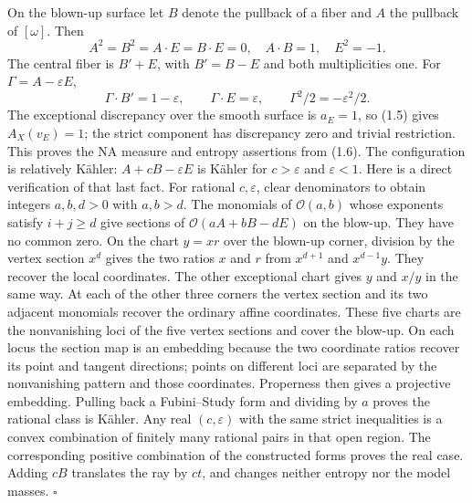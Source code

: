 \documentclass[
  11pt,
]{article}
\begin{document}
On the blown-up surface let \(B\) denote the pullback of a fiber and
\(A\) the pullback of \([\omega]\). Then \[
 A^2=B^2=A\cdot E=B\cdot E=0,\quad A\cdot B=1,\quad E^2=-1.
\] The central fiber is \(B'+E\), with \(B'=B-E\) and both
multiplicities one. For \(\Gamma=A-\varepsilon E\), \[
 \Gamma\cdot B'=1-\varepsilon,\qquad\Gamma\cdot E=\varepsilon,
 \qquad\Gamma^2/2=-\varepsilon^2/2.                                 \tag{3.5}
\] The exceptional discrepancy over the smooth surface is \(a_E=1\), so
(1.5) gives \(A_X(v_E)=1\); the strict component has discrepancy zero
and trivial restriction. This proves the NA measure and entropy
assertions from (1.6). The configuration is relatively Kähler:
\(A+cB-\varepsilon E\) is Kähler for \(c>\varepsilon\) and
\(\varepsilon<1\). Here is a direct verification of that last fact. For
rational \(c,\varepsilon\), clear denominators to obtain integers
\(a,b,d>0\) with \(a,b>d\). The monomials of \(\mathcal O(a,b)\) whose
exponents satisfy \(i+j\geq d\) give sections of
\(\mathcal O(aA+bB-dE)\) on the blow-up. They have no common zero. On
the chart \(y=xr\) over the blown-up corner, division by the vertex
section \(x^d\) gives the two ratios \(x\) and \(r\) from \(x^{d+1}\)
and \(x^{d-1}y\). They recover the local coordinates. The other
exceptional chart gives \(y\) and \(x/y\) in the same way. At each of
the other three corners the vertex section and its two adjacent
monomials recover the ordinary affine coordinates. These five charts are
the nonvanishing loci of the five vertex sections and cover the blow-up.
On each locus the section map is an embedding because the two coordinate
ratios recover its point and tangent directions; points on different
loci are separated by the nonvanishing pattern and those coordinates.
Properness then gives a projective embedding. Pulling back a
Fubini--Study form and dividing by \(a\) proves the rational class is
Kähler. Any real \((c,\varepsilon)\) with the same strict inequalities
is a convex combination of finitely many rational pairs in that open
region. The corresponding positive combination of the constructed forms
proves the real case. Adding \(cB\) translates the ray by \(ct\), and
changes neither entropy nor the model masses. \(\square\)
\end{document}
